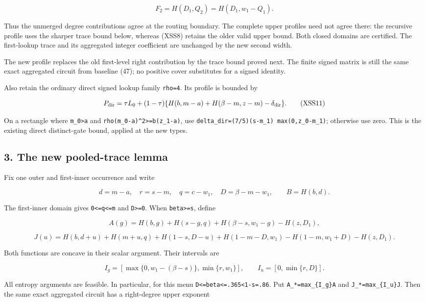 \[
F_2=H(D_1,Q_2)=H(D_1,w_1-Q_1).
\]

Thus the unmerged degree contributions agree at the routing boundary. The complete upper profiles need not agree there: the recursive profile uses the sharper trace bound below, whereas (XSS8) retains the older valid upper bound. Both closed domains are certified. The first-lookup trace and its aggregated integer coefficient are unchanged by the new second width.

The new profile replaces the old first-level right contribution by the trace bound proved next. The finite signed matrix is still the same exact aggregated circuit from baseline (47); no positive cover substitutes for a signed identity.

Also retain the ordinary direct signed lookup family \texttt{rho=4}. Its profile is bounded by

\[
P_{\rm dir}=\tau L_0+(1-\tau)
 \{H(b,m-a)+H(\beta-m,z-m)-\delta_{\rm dir}\}.
 \tag{XSS11}
\]

On a rectangle where \texttt{m\_0\textgreater{}a} and \texttt{rho(m\_0-a)\^{}2\textgreater{}=b(z\_1-a)}, use \texttt{delta\_dir=(7/5)(s-m\_1)\ max(0,z\_0-m\_1)}; otherwise use zero. This is the existing direct distinct-gate bound, applied at the new types.

\hypertarget{af-a9ec399514-the-new-pooled-trace-lemma}{%
\subsection{3. The new pooled-trace lemma}\label{af-a9ec399514-the-new-pooled-trace-lemma}}

Fix one outer and first-inner occurrence and write

\[
d=m-a,\quad r=s-m,\quad q=c-w_1,\quad D=\beta-m-w_1,
 \qquad B=H(b,d).
\]

The first-inner domain gives \texttt{0\textless{}=q\textless{}=m} and \texttt{D\textgreater{}=0}. When \texttt{beta\textgreater{}=s}, define

\[
A(g)=H(b,g)+H(s-g,q)+H(\beta-s,w_1-g)-H(z,D_1),
\]

\[
J(u)=H(b,d+u)+H(m+u,q)+H(1-s,D-u)
       +H(1-m-D,w_1)-H(1-m,w_1+D)-H(z,D_1).
 \tag{XSS12}
\]

Both functions are concave in their scalar argument. Their intervals are

\[
I_g=[\max\{0,w_1-(\beta-s)\},\min\{r,w_1\}],\qquad
 I_u=[0,\min\{r,D\}].
 \tag{XSS13}
\]

All entropy arguments are feasible. In particular, for this menu \texttt{D\textless{}=beta\textless{}=.365\textless{}1-s=.86}. Put \texttt{A\_*=max\_\{I\_g\}A} and \texttt{J\_*=max\_\{I\_u\}J}. Then the same exact aggregated circuit has a right-degree upper exponent

